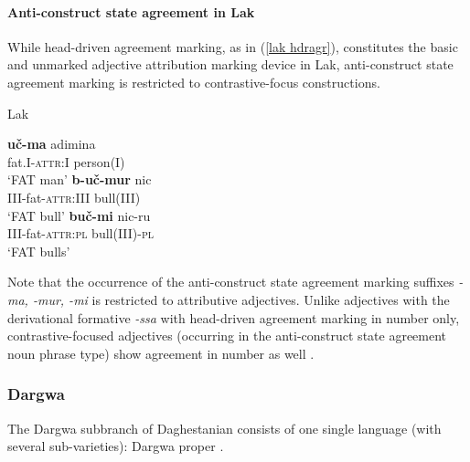 \paragraph{Anti-construct state agreement in Lak}
While head-driven agreement marking, as in (\ref{lak hdragr}), constitutes the basic and unmarked adjective attribution marking device in Lak, anti-construct state agreement marking is restricted to contrastive-focus constructions.
\begin{exe}
\ex 
\rm{Lak \citep[45]{zirkov1955}}%
\begin{xlist}
\ex
\gll	\textbf{uč-ma} adimina\\
	fat.\textsc{I}-\textsc{attr:I} person\textsc{(I)}\\
\glt	‘FAT man’
\ex
\gll	\textbf{b-uč-mur} nic\\
	\textsc{III}-fat-\textsc{attr:III} bull\textsc{(III)}\\
\glt	‘FAT bull’
\ex
\gll	\textbf{buč-mi} nic-ru\\
	\textsc{III}-fat-\textsc{attr:pl} bull\textsc{(III)}-\textsc{pl}\\
\glt	‘FAT bulls’
\end{xlist}
\end{exe}
Note that the occurrence of the anti-construct state agreement marking suffixes \textit{-ma, -mur, -mi} is restricted to attributive adjectives. Unlike adjectives with the derivational formative \textit{-ssa} with head-driven agreement marking in number only, contrastive-focused adjectives (occurring in the anti-construct state agreement noun phrase type) show agreement in number as well \citep[45–51]{zirkov1955}.

\subsubsection{Dargwa}
The Dargwa subbranch of Daghestanian consists of one single language (with several sub-varieties): Dargwa proper \cite[233]{salminen2007}.

